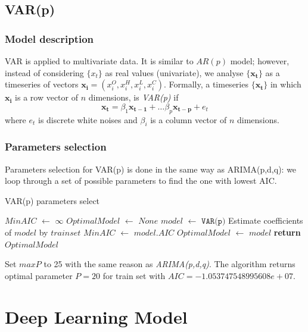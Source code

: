 \documentclass[11pt]{article}
\begin{document}
\subsection{VAR(p)}
\subsubsection{Model description}
VAR is applied to multivariate data. It is similar to $AR(p)$ model; however,
instead of considering $\{x_t\}$ as real values (univariate), we analyse
$\{\mathbf{x_t}\}$ as a timeseries of vectors $\mathbf{x_i}=(x_i^O, x_i^H, x_i^L, x_i^C)$. 
Formally, a timeseries $\{\mathbf{x_t}\}$ in which $\mathbf{x_i}$ is a row
vector of $n$ dimensions, is \textit{VAR(p)} if
$$
\mathbf{x_t}=\beta_1\mathbf{x_{t-1}} + \ldots \beta_p\mathbf{x_{t-p}} + e_t
$$
where $e_t$ is discrete white noises and $\beta_i$ is a column vector of $n$ dimensions.
\subsubsection{Parameters selection}
Parameters selection for VAR(p) is done in the same way as ARIMA(p,d,q): we loop
through a set of possible parameters to find the one with lowest AIC.
\begin{algorithm}[H]
\caption{VAR(p) parameters select}\label{paramsselect2}
\begin{algorithmic}[1]
  \State $MinAIC$ $\gets$ $\infty$
  \State $OptimalModel$ $\gets$ $None$
  \State $model$ $\gets$ $\texttt{VAR(p)}$
  \State Estimate coefficients of $model$ by $trainset$
  \State $MinAIC$ $\gets$ $model.AIC$
  \State $OptimalModel$ $\gets$ $model$
  \EndIf
  \EndFor
  \State \textbf{return} $OptimalModel$
\EndProcedure
\end{algorithmic}
\end{algorithm}
Set $maxP$ to 25 with the same reason as \textit{ARIMA(p,d,q)}. The algorithm
returns optimal parameter $P=20$ for train set with
$AIC=-1.053747548995608e+07$. 



\section{Deep Learning Model}
\end{document}
